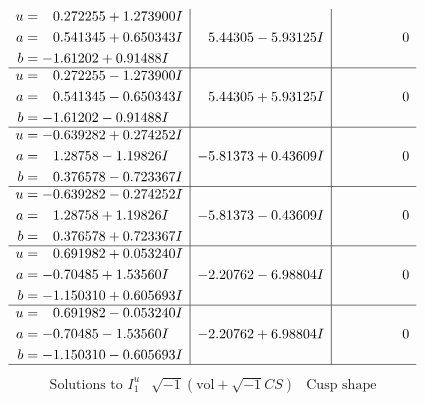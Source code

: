 \documentclass[1p]{elsarticle_modified}
\theoremstyle{definition}
\newcommand{\I}{\sqrt{-1}}
\begin{document}
$$\begin{array}{c|c|c}
\begin{aligned}
u &= \phantom{-}0.272255 + 1.273900 I \\
a &= \phantom{-}0.541345 + 0.650343 I \\
b &= -1.61202 + 0.91488 I\end{aligned}
 & \phantom{-}5.44305 - 5.93125 I & \phantom{-0.000000 } 0 \\ \hline\begin{aligned}
u &= \phantom{-}0.272255 - 1.273900 I \\
a &= \phantom{-}0.541345 - 0.650343 I \\
b &= -1.61202 - 0.91488 I\end{aligned}
 & \phantom{-}5.44305 + 5.93125 I & \phantom{-0.000000 } 0 \\ \hline\begin{aligned}
u &= -0.639282 + 0.274252 I \\
a &= \phantom{-}1.28758 - 1.19826 I \\
b &= \phantom{-}0.376578 - 0.723367 I\end{aligned}
 & -5.81373 + 0.43609 I & \phantom{-0.000000 } 0 \\ \hline\begin{aligned}
u &= -0.639282 - 0.274252 I \\
a &= \phantom{-}1.28758 + 1.19826 I \\
b &= \phantom{-}0.376578 + 0.723367 I\end{aligned}
 & -5.81373 - 0.43609 I & \phantom{-0.000000 } 0 \\ \hline\begin{aligned}
u &= \phantom{-}0.691982 + 0.053240 I \\
a &= -0.70485 + 1.53560 I \\
b &= -1.150310 + 0.605693 I\end{aligned}
 & -2.20762 - 6.98804 I & \phantom{-0.000000 } 0 \\ \hline\begin{aligned}
u &= \phantom{-}0.691982 - 0.053240 I \\
a &= -0.70485 - 1.53560 I \\
b &= -1.150310 - 0.605693 I\end{aligned}
 & -2.20762 + 6.98804 I & \phantom{-0.000000 } 0\\
 \hline 
 \end{array}$$\newpage$$\begin{array}{c|c|c}  
\text{Solutions to }I^u_{1}& \I (\text{vol} + \sqrt{-1}CS) & \text{Cusp shape}\\
 \hline 
\begin{aligned}

\end{aligned}
\end{array}$$
\end{document}
